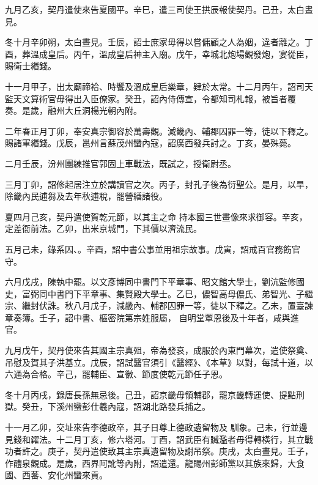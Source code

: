 \begin{pinyinscope}
 九月乙亥，契丹遣使來告夏國平。辛巳，遣三司使王拱辰報使契丹。己丑，太白晝見。



 冬十月辛卯朔，太白晝見。壬辰，詔士庶家毋得以嘗傭顧之人為姻，違者離之。丁酉，葬溫成皇后。丙午，溫成皇后神主入廟。戊午，幸城北炮場觀發炮，宴從臣，賜衛士緡錢。



 十一月甲子，出太廟禘袷、時饗及溫成皇后樂章，肄於太常。十二月丙午，詔司天監天文算術官毋得出入臣僚家。癸丑，詔內侍傳宣，令都知司札報，被旨者覆
 奏。是歲，融州大丘洞楊光朝內附。



 二年春正月丁卯，奉安真宗御容於萬壽觀。減畿內、輔郡囚罪一等，徒以下釋之。賜諸軍緡錢。戊辰，邕州言蘇茂州蠻內寇，詔廣西發兵討之。丁亥，晏殊薨。



 二月壬辰，汾州團練推官郭固上車戰法，既試之，授衛尉丞。



 三月丁卯，詔修起居注立於講讀官之次。丙子，封孔子後為衍聖公。是月，以旱，除畿內民逋芻及去年秋逋稅，罷營繕諸役。



 夏四月己亥，契丹遣使賀乾元節，以其主之命
 持本國三世畫像來求御容。辛亥，定差衙前法。乙卯，出米京城門，下其價以濟流民。



 五月己未，錄系囚、。辛酉，詔中書公事並用祖宗故事。戊寅，詔戒百官務飭官守。



 六月戊戌，陳執中罷。以文彥博同中書門下平章事、昭文館大學士，劉沆監修國史，富弼同中書門下平章事、集賢殿大學士。乙巳，儂智高母儂氏、弟智光、子繼宗、繼封伏誅。秋八月戊子，減畿內、輔郡囚罪一等，徒以下釋之。乙未，置臺諫章奏簿。壬子，詔中書、樞密院第宗姓服屬，
 自明堂覃恩後及十年者，咸與進官。



 九月戊午，契丹使來告其國主宗真殂，帝為發哀，成服於內東門幕次，遣使祭奠、吊慰及賀其子洪基立。戊辰，詔試醫官須引《醫經》、《本草》以對，每試十道，以六通為合格。辛己，罷輔臣、宣徽、節度使乾元節任子恩。



 冬十月丙戌，錄唐長孫無忌後。己丑，詔京畿毋領輔郡，罷京畿轉運使、提點刑獄。癸丑，下溪州蠻彭仕羲內寇，詔湖北路發兵捕之。



 十一月乙卯，交址來告李德政卒，其子日尊上德政遺留物及
 馴象。己未，行並邊見錢和糴法。十二月丁亥，修六塔河。丁酉，詔武臣有贓濫者毋得轉橫行，其立戰功者許之。庚子，契丹遣使致其主宗真遺留物及謝吊祭。庚戌，太白晝見。壬子，作醴泉觀成。是歲，西界阿訛等內附，詔遣還。龍賜州彭師黨以其族來歸，大食國、西蕃、安化州蠻來貢。




\end{pinyinscope}
